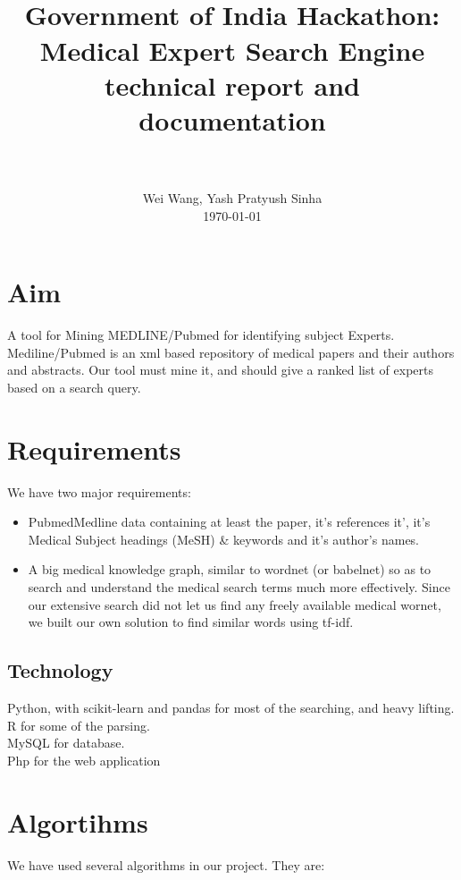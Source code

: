 \documentclass[paper=a4, fontsize=11pt]{scrartcl}
\title{
		\usefont{OT1}{bch}{b}{n}
		\horrule{0.5pt} \\[0.4cm]
		\huge Government of India Hackathon: Medical Expert Search Engine technical report and documentation\\
		\horrule{2pt} \\[0.5cm]
}
\author{
		\normalfont 								\normalsize
        Wei Wang, Yash Pratyush Sinha\\[-3pt]		\normalsize
        \today
}
\date{}
\numberwithin{equation}{section}		%
\numberwithin{figure}{section}			%
\numberwithin{table}{section}				%
\begin{document}
\maketitle
\section{Aim}
A tool for Mining MEDLINE/Pubmed for identifying subject Experts. Mediline/Pubmed is an xml based repository of medical papers and their authors and abstracts. Our tool must mine it, and should give a ranked list of experts based on a search query.


\section{Requirements}
We have two major requirements:
\begin{itemize}
\item Pubmed\/Medline data containing at least the paper, it's references it', it's Medical Subject headings (MeSH) \& keywords and it's author's names.
\item A big medical knowledge graph, similar to wordnet (or babelnet) so as to search and understand the medical search terms much more effectively. 
Since our extensive search did not let us find any freely available medical wornet, we built our own solution to find similar words using tf-idf.
\end{itemize}

\subsection{Technology}
Python, with scikit-learn and pandas for most of the searching, and heavy lifting. \\
R for some of the parsing.\\
MySQL for database.\\
Php for the web application \\


\section{Algortihms}
We have used several algorithms in our project. They are:
\end{document}
